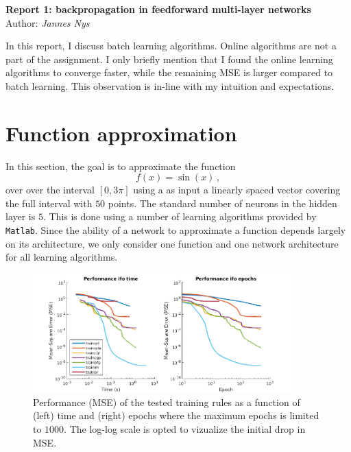 \documentclass[10pt,a4paper]{article}
\begin{document}
\begin{center}
\Large\textbf{Report 1: backpropagation in feedforward multi-layer networks}\\
\large Author: \textit{Jannes Nys}
\end{center}

In this report, I discuss batch learning algorithms. Online algorithms are not a part of the assignment. I only briefly mention that I found the online learning algorithms to converge faster, while the remaining MSE is larger compared to batch learning. This observation is in-line with my intuition and expectations.

\section{Function approximation}
In this section, the goal is to approximate the function
\begin{equation}\label{eq:myfunction}
f(x) = \sin(x)\,,
\end{equation}
over over the interval $[0,3\pi]$ using a as input a linearly spaced vector covering the full interval with $50$ points. The standard number of neurons in the hidden layer is $5$. This is done using a number of learning algorithms provided by \texttt{Matlab}. Since the ability of a network to approximate a function depends largely on its architecture, we only consider one function and one network architecture for all learning algorithms.

\begin{figure}[htb]
\centering
\includegraphics[width=0.9\textwidth]{figs/performance_plot.png}
\caption{Performance (MSE) of the tested training rules as a function of (left) time and (right) epochs where the maximum epochs is limited to $1000$. The log-log scale is opted to vizualize the initial drop in MSE. \label{fig:performace_plot}}
\end{figure}
\end{document}
